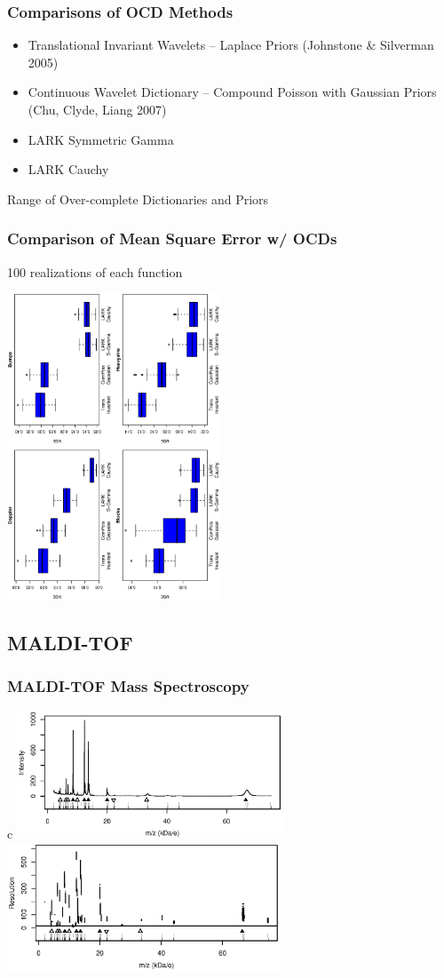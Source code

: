 \documentclass[dvips]{beamer}
\newcommand{\bs}[2]{\begin{frame} \frametitle{#1} 
{#2}
\end{frame} }
\begin{document}
\bs{Comparisons of OCD Methods} {
  \begin{itemize}
  \item Translational Invariant Wavelets -- Laplace Priors
    (Johnstone \& Silverman     2005)  
  \item Continuous Wavelet Dictionary -- Compound Poisson with
    Gaussian Priors (Chu, Clyde, Liang 2007)
  \item LARK Symmetric Gamma
  \item LARK Cauchy
  \end{itemize}
Range of Over-complete Dictionaries and Priors
}
\bs{Comparison of Mean Square Error w/ OCDs} {
100 realizations of each function

\centerline{\includegraphics[width=2.5in,angle=270]{mse.eps} }
}
\subsection{MALDI-TOF}
\bs{MALDI-TOF Mass Spectroscopy} {
\begin{center}
\begin{tabular}[h]{{c}}
  \includegraphics[height=1.5in]{knownMean.2.75.both.ps} \\
  \includegraphics[height=1.5in]{known.res.vs.mz.both.ps} 
\end{tabular}

\end{center}

}
\end{document}
